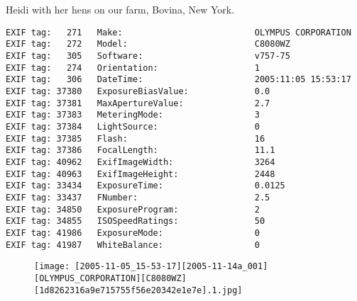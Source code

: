 \section{\protect{}}
\noindent Heidi with her hens on our farm, Bovina, New York.
\noindent
\begin{lstlisting}
EXIF tag:   271   Make:                          OLYMPUS CORPORATION
EXIF tag:   272   Model:                         C8080WZ
EXIF tag:   305   Software:                      v757-75
EXIF tag:   274   Orientation:                   1
EXIF tag:   306   DateTime:                      2005:11:05 15:53:17
EXIF tag: 37380   ExposureBiasValue:             0.0
EXIF tag: 37381   MaxApertureValue:              2.7
EXIF tag: 37383   MeteringMode:                  3
EXIF tag: 37384   LightSource:                   0
EXIF tag: 37385   Flash:                         16
EXIF tag: 37386   FocalLength:                   11.1
EXIF tag: 40962   ExifImageWidth:                3264
EXIF tag: 40963   ExifImageHeight:               2448
EXIF tag: 33434   ExposureTime:                  0.0125
EXIF tag: 33437   FNumber:                       2.5
EXIF tag: 34850   ExposureProgram:               2
EXIF tag: 34855   ISOSpeedRatings:               50
EXIF tag: 41986   ExposureMode:                  0
EXIF tag: 41987   WhiteBalance:                  0

\end{lstlisting}
\clearpage
\begin{figure}
\raggedleft
\texttt{[image: [2005-11-05\_15-53-17][2005-11-14a\_001][OLYMPUS\_CORPORATION][C8080WZ][1d8262316a9e715755f56e20342e1e7e].1.jpg]}
\end{figure}


\clearpage
